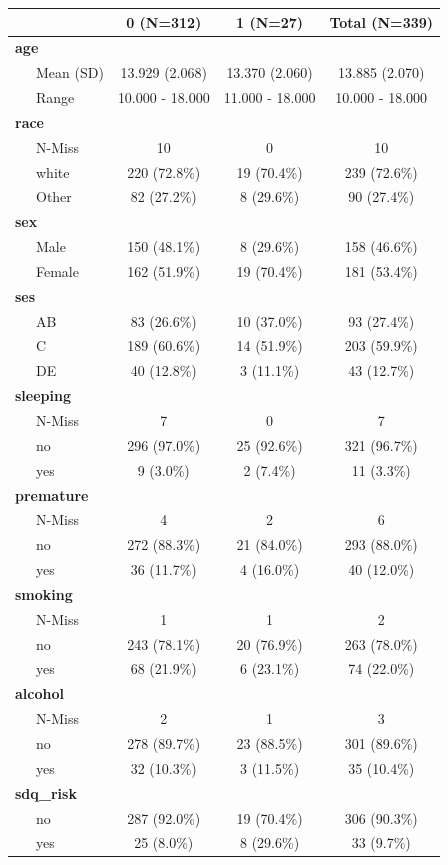 \documentclass[
]{book}
\begin{document}
\begin{longtable}[]{@{}lccc@{}}
\toprule
& 0 (N=312) & 1 (N=27) & Total (N=339) \\
\midrule
\endhead
\textbf{age} & & & \\
~~~Mean (SD) & 13.929 (2.068) & 13.370 (2.060) & 13.885 (2.070) \\
~~~Range & 10.000 - 18.000 & 11.000 - 18.000 & 10.000 - 18.000 \\
\textbf{race} & & & \\
~~~N-Miss & 10 & 0 & 10 \\
~~~white & 220 (72.8\%) & 19 (70.4\%) & 239 (72.6\%) \\
~~~Other & 82 (27.2\%) & 8 (29.6\%) & 90 (27.4\%) \\
\textbf{sex} & & & \\
~~~Male & 150 (48.1\%) & 8 (29.6\%) & 158 (46.6\%) \\
~~~Female & 162 (51.9\%) & 19 (70.4\%) & 181 (53.4\%) \\
\textbf{ses} & & & \\
~~~AB & 83 (26.6\%) & 10 (37.0\%) & 93 (27.4\%) \\
~~~C & 189 (60.6\%) & 14 (51.9\%) & 203 (59.9\%) \\
~~~DE & 40 (12.8\%) & 3 (11.1\%) & 43 (12.7\%) \\
\textbf{sleeping} & & & \\
~~~N-Miss & 7 & 0 & 7 \\
~~~no & 296 (97.0\%) & 25 (92.6\%) & 321 (96.7\%) \\
~~~yes & 9 (3.0\%) & 2 (7.4\%) & 11 (3.3\%) \\
\textbf{premature} & & & \\
~~~N-Miss & 4 & 2 & 6 \\
~~~no & 272 (88.3\%) & 21 (84.0\%) & 293 (88.0\%) \\
~~~yes & 36 (11.7\%) & 4 (16.0\%) & 40 (12.0\%) \\
\textbf{smoking} & & & \\
~~~N-Miss & 1 & 1 & 2 \\
~~~no & 243 (78.1\%) & 20 (76.9\%) & 263 (78.0\%) \\
~~~yes & 68 (21.9\%) & 6 (23.1\%) & 74 (22.0\%) \\
\textbf{alcohol} & & & \\
~~~N-Miss & 2 & 1 & 3 \\
~~~no & 278 (89.7\%) & 23 (88.5\%) & 301 (89.6\%) \\
~~~yes & 32 (10.3\%) & 3 (11.5\%) & 35 (10.4\%) \\
\textbf{sdq\_risk} & & & \\
~~~no & 287 (92.0\%) & 19 (70.4\%) & 306 (90.3\%) \\
~~~yes & 25 (8.0\%) & 8 (29.6\%) & 33 (9.7\%) \\
\bottomrule
\end{longtable}
\end{document}
